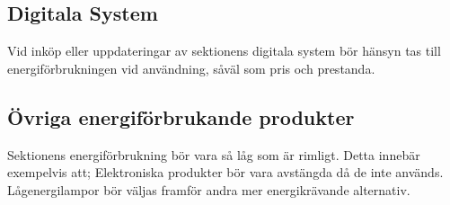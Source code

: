 \documentclass[11pt, includeaddress]{classes/cthit}
\begin{document}
\subsection{Digitala System}
Vid inköp eller uppdateringar av sektionens digitala system bör hänsyn tas till
energiförbrukningen vid användning, såväl som pris och prestanda.

\subsection{Övriga energiförbrukande produkter}
Sektionens energiförbrukning bör vara så låg som är rimligt. Detta innebär exempelvis att;
Elektroniska produkter bör vara avstängda då de inte används.
Lågenergilampor bör väljas framför andra mer energikrävande alternativ.
\end{document}
